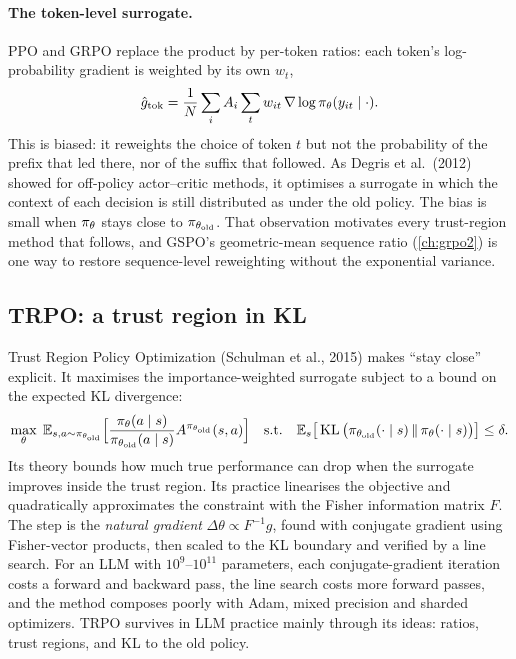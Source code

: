 \paragraph{The token-level surrogate.} PPO and GRPO replace the product by per-token ratios:
each token's log-probability gradient is weighted by its own $w_t$,
\[
\hat g_{\text{tok}}=\frac{1}{N}\sum_i A_i\sum_t w_{it}\,\nabla\log\pi_\theta(y_{it}\mid\cdot).
\]
This is biased: it reweights the choice of token $t$ but not the probability of the prefix
that led there, nor of the suffix that followed. As Degris et al.\ (2012) showed for
off-policy actor--critic methods, it optimises a surrogate in which the context of each
decision is still distributed as under the old policy. The bias is small when $\pi_\theta$
stays close to $\pi_{\theta_{\text{old}}}$. That observation motivates every trust-region method that follows,
and GSPO's geometric-mean sequence ratio (\cref{ch:grpo2}) is one way to restore
sequence-level reweighting without the exponential variance.

\subsection{TRPO: a trust region in KL}\label{sec:pg:trpo}

Trust Region Policy Optimization (Schulman et al., 2015) makes ``stay close'' explicit. It
maximises the importance-weighted surrogate subject to a bound on the expected KL divergence:
\begin{equation}
\max_\theta\;\mathbb{E}_{s,a\sim\pi_{\theta_{\text{old}}}}\Big[\frac{\pi_\theta(a\mid s)}{\pi_{\theta_{\text{old}}}(a\mid s)}A^{\pi_{\theta_{\text{old}}}}(s,a)\Big]
\quad\text{s.t.}\quad \mathbb{E}_s\big[\operatorname{KL}\big(\pi_{\theta_{\text{old}}}(\cdot\mid s)\,\|\,\pi_\theta(\cdot\mid s)\big)\big]\le\delta .
\end{equation}
Its theory bounds how much true performance can drop when the surrogate improves inside the
trust region. Its practice linearises the objective and quadratically approximates the
constraint with the Fisher information matrix $F$. The step is the \emph{natural gradient}
$\Delta\theta\propto F^{-1}g$, found with conjugate gradient using Fisher-vector products, then
scaled to the KL boundary and verified by a line search. For an LLM with $10^9$--$10^{11}$
parameters, each conjugate-gradient iteration costs a forward and backward pass, the line
search costs more forward passes, and the method composes poorly with Adam, mixed precision
and sharded optimizers. TRPO survives in LLM practice mainly through its ideas: ratios, trust
regions, and KL to the old policy.

